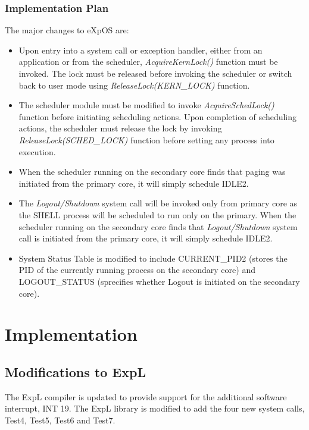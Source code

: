\documentclass[12pt]{report}
\begin{document}
\subsection{Implementation Plan}
The major changes to eXpOS are:
\begin{itemize}
    \item Upon entry into a system call or exception handler, either from an application or from the scheduler, \emph{AcquireKernLock()} function must be invoked. The lock must be released before invoking the scheduler or switch back to user mode using \emph{ReleaseLock(KERN\_LOCK)} function.
    \item The scheduler module must be modified to invoke \emph{AcquireSchedLock()} function before initiating scheduling actions. Upon completion of scheduling actions, the scheduler must release the lock by invoking \emph{ReleaseLock(SCHED\_LOCK)} function before setting any process into execution.
    \item When the scheduler running on the secondary core finds that paging was initiated from the primary core, it will simply schedule IDLE2.
    \item The \emph{Logout/Shutdown} system call will be invoked only from primary core as the SHELL process will be scheduled to run only on the primary. When the scheduler running on the secondary core finds that \emph{Logout/Shutdown} system call is initiated from the primary core, it will simply schedule IDLE2.
    \item System Status Table is modified to include CURRENT\_PID2 (stores the PID of the currently running process on the secondary core) and LOGOUT\_STATUS (sprecifies whether Logout is initiated on the secondary core).
\end{itemize}

\chapter{Implementation}
\section{Modifications to ExpL}
The ExpL compiler is updated to provide support for the additional software interrupt, INT 19. The ExpL library is modified to add the four new system calls, Test4, Test5, Test6 and Test7.
\end{document}
